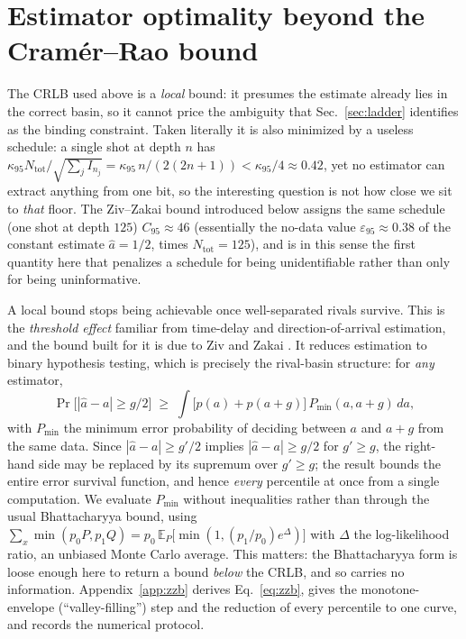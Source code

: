 \documentclass[%
 twocolumn,
 amsmath,amssymb,
prx,
longbibliography
]{revtex4-2}
\newcommand{\Ntot}{N_{\mathrm{tot}}}
\begin{document}
\section{Estimator optimality beyond the Cram\'er--Rao bound}\label{sec:zzb}

The \ac{CRLB} used above is a \emph{local} bound: it presumes the estimate already lies in the correct basin, so it cannot price the ambiguity that Sec.~\ref{sec:ladder} identifies as the binding constraint. Taken literally it is also minimized by a useless schedule: a single shot at depth $n$ has $\kappa_{95}\Ntot/\sqrt{\sum_j I_{n_j}} = \kappa_{95}\,n/(2(2n+1)) < \kappa_{95}/4 \approx 0.42$, yet no estimator can extract anything from one bit, so the interesting question is not how close we sit to \emph{that} floor. The Ziv--Zakai bound introduced below assigns the same schedule (one shot at depth $125$) $C_{95} \approx 46$ (essentially the no-data value $\varepsilon_{95} \approx 0.38$ of the constant estimate $\hat a = 1/2$, times $\Ntot = 125$), and is in this sense the first quantity here that penalizes a schedule for being unidentifiable rather than only for being uninformative.

A local bound stops being achievable once well-separated rivals survive. This is the \emph{threshold effect} familiar from time-delay and direction-of-arrival estimation, and the bound built for it is due to Ziv and Zakai \cite{ziv1969some, bell1997extended}. It reduces estimation to binary hypothesis testing, which is precisely the rival-basin structure: for \emph{any} estimator,
\begin{equation}\label{eq:zzb}
    \Pr\big[|\hat a - a| \ge g/2\big] \;\ge\; \int \big[p(a) + p(a{+}g)\big]\, P_{\min}(a, a{+}g)\, da ,
\end{equation}
with $P_{\min}$ the minimum error probability of deciding between $a$ and $a+g$ from the same data. Since $|\hat a - a| \ge g'/2$ implies $|\hat a - a| \ge g/2$ for $g' \ge g$, the right-hand side may be replaced by its supremum over $g' \ge g$; the result bounds the entire error survival function, and hence \emph{every} percentile at once from a single computation. We evaluate $P_{\min}$ without inequalities rather than through the usual Bhattacharyya bound, using $\sum_x \min(p_0 P, p_1 Q) = p_0\,\mathbb{E}_{P}\big[\min(1, (p_1/p_0)e^{\Delta})\big]$ with $\Delta$ the log-likelihood ratio, an unbiased Monte Carlo average. This matters: the Bhattacharyya form is loose enough here to return a bound \emph{below} the \ac{CRLB}, and so carries no information. Appendix~\ref{app:zzb} derives Eq.~\eqref{eq:zzb}, gives the monotone-envelope (``valley-filling'') step and the reduction of every percentile to one curve, and records the numerical protocol.
\end{document}
